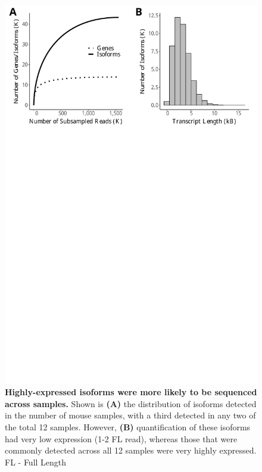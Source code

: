 \vspace{1cm}
\begin{figure}[!h]
	\begin{center}
		\includegraphics[page=2,trim={0 26cm 0 0},clip,scale = 0.55]{Figures/IsoSeqWholeTranscriptome.pdf}
	\end{center}
	\captionsetup{width=0.95\textwidth}
	\caption[Isoform diversity across the samples from global transcriptome profiling]%
	{\textbf{Highly-expressed isoforms were more likely to be sequenced across samples.} Shown is \textbf{(A)} the distribution of isoforms detected in the number of mouse samples, with a third detected in any two of the total 12 samples. However, \textbf{(B)} quantification of these isoforms had very low expression (1-2 FL read), whereas those that were commonly detected across all 12 samples were very highly expressed. FL - Full Length}
	\label{fig:isoseq_whole_lowlyexp}
\end{figure}

